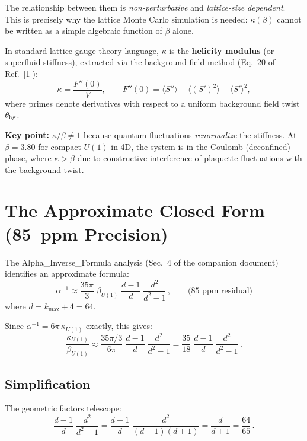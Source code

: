 \documentclass[12pt,a4paper]{article}
\begin{document}
The relationship between them is \emph{non-perturbative} and
\emph{lattice-size dependent}.  This is precisely why the lattice
Monte Carlo simulation is needed: $\kappa(\beta)$ cannot be written as
a simple algebraic function of $\beta$ alone.

In standard lattice gauge theory language, $\kappa$ is the
\textbf{helicity modulus} (or superfluid stiffness), extracted via the
background-field method (Eq.~20 of Ref.~[1]):
\begin{equation}
\kappa = \frac{F''(0)}{V}, \qquad
F''(0) = \langle S'' \rangle - \langle (S')^2 \rangle + \langle S' \rangle^2,
\end{equation}
where primes denote derivatives with respect to a uniform background
field twist $\theta_{\rm bg}$.

\textbf{Key point:} $\kappa/\beta \neq 1$ because quantum fluctuations
\emph{renormalize} the stiffness.  At $\beta = 3.80$ for compact $U(1)$
in 4D, the system is in the Coulomb (deconfined) phase, where
$\kappa > \beta$ due to constructive interference of plaquette
fluctuations with the background twist.

\section{The Approximate Closed Form (85~ppm Precision)}

The Alpha\_Inverse\_Formula analysis (Sec.~4 of the companion document)
identifies an approximate formula:
\begin{equation}
\alpha^{-1} \approx \frac{35\pi}{3}\;\beta_{U(1)}\;
\frac{d-1}{d}\;\frac{d^2}{d^2-1}\,,
\qquad \text{(85~ppm residual)}
\end{equation}
where $d = k_{\max} + 4 = 64$.

Since $\alpha^{-1} = 6\pi\,\kappa_{U(1)}$ exactly, this gives:
\begin{equation}
\frac{\kappa_{U(1)}}{\beta_{U(1)}}
\approx \frac{35\pi/3}{6\pi}\;\frac{d-1}{d}\;\frac{d^2}{d^2-1}
= \frac{35}{18}\;\frac{d-1}{d}\;\frac{d^2}{d^2-1}\,.
\end{equation}

\subsection{Simplification}

The geometric factors telescope:
\begin{equation}
\frac{d-1}{d}\;\frac{d^2}{d^2-1}
= \frac{d-1}{d}\;\frac{d^2}{(d-1)(d+1)}
= \frac{d}{d+1}
= \frac{64}{65}\,.
\end{equation}
\end{document}
